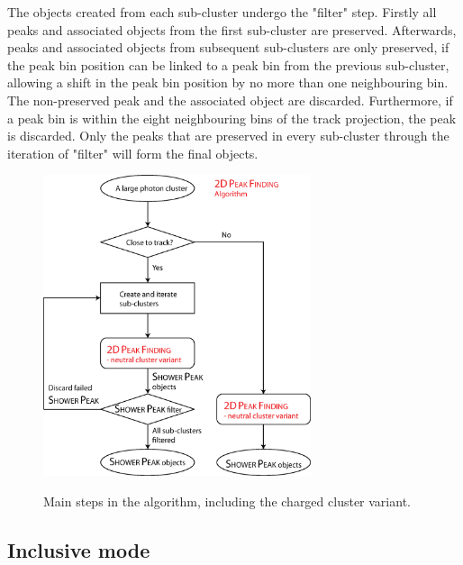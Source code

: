The \ShowerPeak objects created from each sub-cluster undergo the "\ShowerPeak filter" step. Firstly all peaks and associated \ShowerPeak  objects from the first sub-cluster are preserved. Afterwards, peaks and associated \ShowerPeak objects from subsequent sub-clusters are only preserved, if the peak bin position can be linked to a peak bin from the previous sub-cluster, allowing a shift in the peak bin position  by no more than one neighbouring bin. The non-preserved peak and the associated \ShowerPeak object are discarded. Furthermore, if a peak bin is within the eight neighbouring bins of the track projection, the peak is  discarded. Only the peaks that are preserved in every sub-cluster through the iteration of "\ShowerPeak filter" will form the final \ShowerPeak objects.

\begin{figure}[tbph]
\centering
{\includegraphics[width=0.7\textwidth]{photon/2DpeakFindingTrack}}
\caption[Flow chart for \peakFinding algorithm.]
{Main steps in the  \peakFinding algorithm, including the charged cluster variant.}
\label{fig:photonPeakFindingFlow}
\end{figure}


\subsection{Inclusive mode}
\label{sec:photonPeakFindingInclusive}

